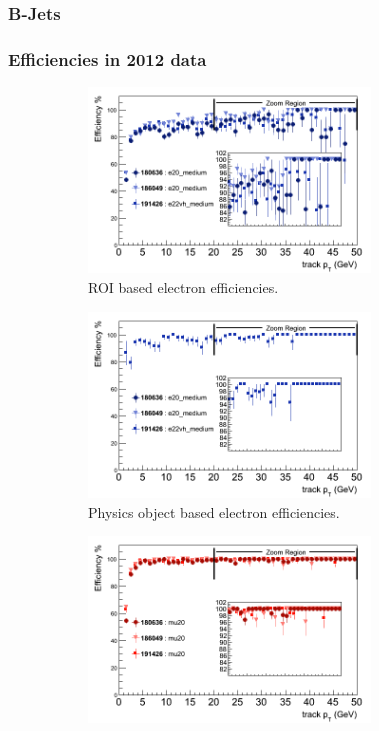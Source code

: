 \subsubsection*{B-Jets}

\subsubsection{Efficiencies in 2012 data}

\clearpage

\begin{figure}[htbp]
	\begin{subfigure}{.5\linewidth}
		\centering
		\includegraphics[width=75mm]{f/e20_medium_IDTrkNoCut_pT_IDS_eff}
		\caption{ROI based electron efficiencies.}
		\label{fig:trig_2011_L2_pt_a}
	\end{subfigure}
	\begin{subfigure}{.5\linewidth}	
		\centering
		\includegraphics[width=75mm]{f/e20_medium_IDTrkNoCut_pT_IDS_eff_comb}
		\caption{Physics object based electron efficiencies.}
		\label{fig:trig_2011_L2_pt_b}
	\end{subfigure}
	\begin{subfigure}{.5\linewidth}	
		\centering
		\includegraphics[width=75mm]{f/mu20_IDTrkNoCut_pT_IDS_eff}

\end{subfigure}
\end{figure}
